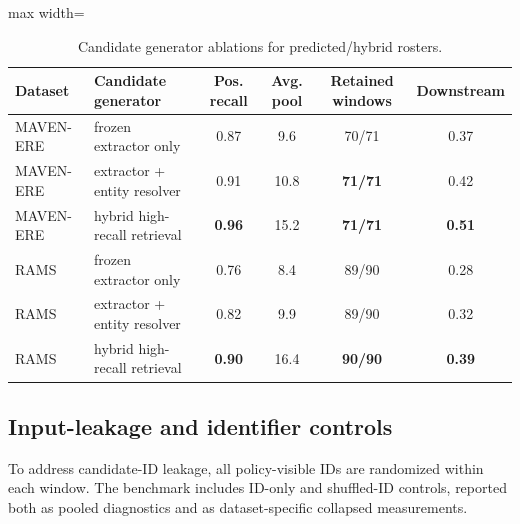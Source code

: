 \documentclass{article}
\begin{document}
\begin{table}[h]
\centering
\caption{Candidate generator ablations for predicted/hybrid rosters.}
\label{tab:candidate_generator_ablation}
\small
\begin{adjustbox}{max width=\linewidth}
\begin{tabular}{l l c c c c}
\toprule
Dataset & Candidate generator & Pos. recall & Avg. pool & Retained windows & Downstream \CertNDCG@10 \\
\midrule
MAVEN-ERE & frozen extractor only & 0.87 & 9.6 & 70/71 & 0.37 \\
MAVEN-ERE & extractor + entity resolver & 0.91 & 10.8 & \textbf{71/71} & 0.42 \\
MAVEN-ERE & hybrid high-recall retrieval & \textbf{0.96} & 15.2 & \textbf{71/71} & \textbf{0.51} \\
RAMS & frozen extractor only & 0.76 & 8.4 & 89/90 & 0.28 \\
RAMS & extractor + entity resolver & 0.82 & 9.9 & 89/90 & 0.32 \\
RAMS & hybrid high-recall retrieval & \textbf{0.90} & 16.4 & \textbf{90/90} & \textbf{0.39} \\
\bottomrule
\end{tabular}
\end{adjustbox}
\end{table}

\subsection{Input-leakage and identifier controls}
\label{sec:app_id_controls}

To address candidate-ID leakage, all policy-visible IDs are randomized within each window. The benchmark includes ID-only and shuffled-ID controls, reported both as pooled diagnostics and as dataset-specific collapsed measurements.
\end{document}
